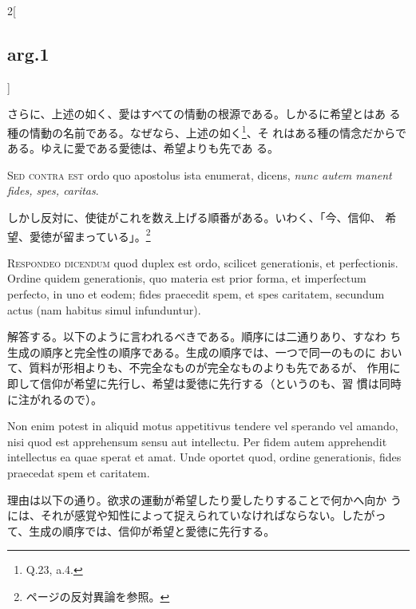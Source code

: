 \documentclass[paper=a4paper,fontsize=10pt,jafontsize=9pt,titlepage]{jlreq}
\begin{document}
\begin{paracol}{2}[\subsection{arg.1}]
\switchcolumn

さらに、上述の如く、愛はすべての情動の根源である。しかるに希望とはあ
 る種の情動の名前である。なぜなら、上述の如く\footnote{Q.23, a.4.}、そ
 れはある種の情念だからである。ゆえに愛である愛徳は、希望よりも先であ
 る。

\switchcolumn*[\subsection{s.c.}]

{\scshape Sed contra est} ordo quo apostolus ista enumerat, dicens,
{\itshape nunc autem manent fides, spes, caritas}.

\switchcolumn

しかし反対に、使徒がこれを数え上げる順番がある。いわく、「今、信仰、
 希望、愛徳が留まっている」。\footnote{\pageref{fides_spes_caritas}ページの反対異論を参照。}


{\scshape Respondeo dicendum} quod duplex est ordo, scilicet
 generationis, et perfectionis. Ordine quidem generationis, quo
 materia est prior forma, et imperfectum perfecto, in uno et eodem;
 fides praecedit spem, et spes caritatem, secundum actus (nam habitus
 simul infunduntur).

\switchcolumn

解答する。以下のように言われるべきである。順序には二通りあり、すなわ
 ち生成の順序と完全性の順序である。生成の順序では、一つで同一のものに
 おいて、質料が形相よりも、不完全なものが完全なものよりも先であるが、
 作用に即して信仰が希望に先行し、希望は愛徳に先行する（というのも、習
 慣は同時に注がれるので）。

\switchcolumn*

Non enim potest in aliquid motus appetitivus tendere vel sperando vel
 amando, nisi quod est apprehensum sensu aut intellectu. Per fidem
 autem apprehendit intellectus ea quae sperat et amat. Unde oportet
 quod, ordine generationis, fides praecedat spem et caritatem.

\switchcolumn

理由は以下の通り。欲求の運動が希望したり愛したりすることで何かへ向か
 うには、それが感覚や知性によって捉えられていなければならない。したがっ
 て、生成の順序では、信仰が希望と愛徳に先行する。

\switchcolumn*


\end{paracol}
\end{document}
